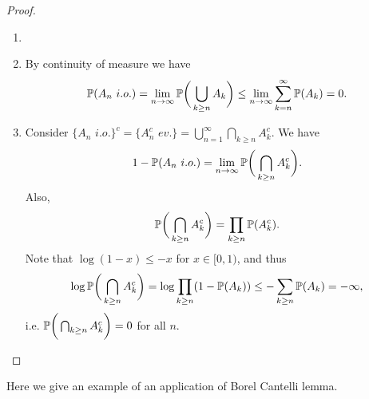 \begin{proof}
\begin{enumerate}
    \item[]
    \item By continuity of measure we have
    \begin{equation*}
        \mathbb{P} (A_n \,\, i.o.) = \lim_{n\to\infty} \mathbb{P} \bigg(\bigcup_{k\ge n} A_k \bigg) \le \lim_{n \to \infty} \sum_{k=n}^\infty \mathbb{P}(A_k) = 0.
    \end{equation*}
    \item Consider $\{A_n \, \, i.o. \}^c = \big\{ A_n^c \,\,  ev.  \big\} = \bigcup_{n=1}^\infty \bigcap_{k \ge n} A_k^c$. We have
    \begin{equation*}
        1 - \mathbb{P}(A_n \, \, i.o.) = \lim_{n\to \infty} \mathbb{P}\bigg( \bigcap_{k\ge n} A_k^c \bigg).
    \end{equation*}
    Also, 
    \begin{equation*}
        \mathbb{P}\bigg( \bigcap_{k\ge n} A_k^c \bigg) = \prod_{k \ge n}\mathbb{P}(A_k^c).
    \end{equation*}
    Note that $\log(1-x) \le -x$ for $x \in [0, 1)$, and thus 
    \begin{equation*}
        \log\mathbb{P}\bigg( \bigcap_{k\ge n} A_k^c \bigg) = \log \prod_{k\ge n}(1 - \mathbb{P}(A_k)) \le -\sum_{k \ge n}\mathbb{P}(A_k) = -\infty,
    \end{equation*}
    i.e. $\mathbb{P}\bigg( \bigcap_{k\ge n} A_k^c \bigg) = 0$ for all $n$.
\end{enumerate}
\end{proof}

Here we give an example of an application of Borel Cantelli lemma.


